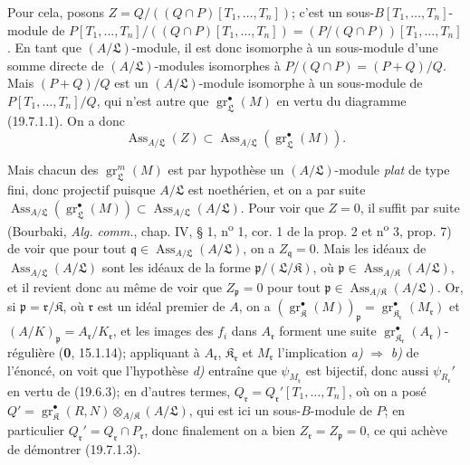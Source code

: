 Pour cela, posons $Z=Q/((Q\cap P)[T_1,\ldots,T_n])$; c'est un sous-$B[T_1,\ldots,T_n]$-module de $P[T_1,\ldots,T_n]/((Q\cap P)[T_1,\ldots,T_n])=(P/(Q\cap P))[T_1,\ldots,T_n]$. En tant que $(A/\mathfrak L)$-module, il est donc isomorphe à un sous-module d'une somme directe de $(A/\mathfrak L)$-modules isomorphes à $P/(Q\cap P)=(P+Q)/Q$. Mais $(P+Q)/Q$ est un $(A/\mathfrak L)$-module isomorphe à un sous-module de $P[T_1,\ldots,T_n]/Q$, qui n'est autre que $\operatorname{gr}_{\mathfrak L}^\bullet(M)$ en vertu du diagramme (19.7.1.1). On a donc
\begin{equation}
  \operatorname{Ass}_{A/\mathfrak L}(Z)\subset\operatorname{Ass}_{A/\mathfrak L}(\operatorname{gr}_{\mathfrak L}^\bullet(M)).
  \tag{19.7.1.4}\label{IV.19.7.1.4}
\end{equation}

Mais chacun des $\operatorname{gr}_{\mathfrak L}^m(M)$ est par hypothèse un $(A/\mathfrak L)$-module \emph{plat} de type fini, donc projectif puisque $A/\mathfrak L$ est noethérien, et on a par suite $\operatorname{Ass}_{A/\mathfrak L}(\operatorname{gr}_{\mathfrak L}^\bullet(M))\subset\operatorname{Ass}_{A/\mathfrak L}(A/\mathfrak L)$. Pour voir que $Z=0$, il suffit par suite (Bourbaki, \emph{Alg. comm.}, chap. IV, § 1, n\textsuperscript{o} 1, cor. 1 de la prop. 2 et n\textsuperscript{o} 3, prop. 7) de voir que pour tout $\mathfrak q\in\operatorname{Ass}_{A/\mathfrak L}(A/\mathfrak L)$, on a $Z_{\mathfrak q}=0$. Mais les idéaux de $\operatorname{Ass}_{A/\mathfrak L}(A/\mathfrak L)$ sont les idéaux de la forme $\mathfrak p/(\mathfrak L/\mathfrak K)$, où $\mathfrak p\in\operatorname{Ass}_{A/\mathfrak K}(A/\mathfrak L)$, et il revient donc au même de voir que $Z_{\mathfrak p}=0$ pour tout $\mathfrak p\in\operatorname{Ass}_{A/\mathfrak K}(A/\mathfrak L)$. Or, si $\mathfrak p=\mathfrak r/\mathfrak K$, où $\mathfrak r$ est un idéal premier de $A$, on a $(\operatorname{gr}_{\mathfrak K}^\bullet(M))_{\mathfrak p}=\operatorname{gr}_{\mathfrak K_{\mathfrak r}}^\bullet(M_{\mathfrak r})$ et $(A/K)_{\mathfrak p}=A_{\mathfrak r}/K_{\mathfrak r}$, et les images des $f_i$ dans $A_{\mathfrak r}$ forment une suite $\operatorname{gr}_{\mathfrak K_{\mathfrak r}}^\bullet(A_{\mathfrak r})$-régulière (\textbf{0}, 15.1.14); appliquant à $A_{\mathfrak r}$, $\mathfrak K_{\mathfrak r}$ et $M_{\mathfrak r}$ l'implication \emph{a)} $\Rightarrow$ \emph{b)} de l'énoncé, on voit que l'hypothèse \emph{d)} entraîne que $\psi_{M_{\mathfrak r}}$ est bijectif, donc aussi $\psi_{R_{\mathfrak r}}'$ en vertu de (19.6.3); en d'autres termes, $Q_{\mathfrak r}=Q_{\mathfrak r}'[T_1,\ldots,T_n]$, où on a posé $Q'=\operatorname{gr}_{\mathfrak K}^\bullet(R,N)\otimes_{A/\mathfrak K}(A/\mathfrak L)$, qui est ici un sous-$B$-module de $P$; en particulier $Q_{\mathfrak r}'=Q_{\mathfrak r}\cap P_{\mathfrak r}$, donc finalement on a bien $Z_{\mathfrak r}=Z_{\mathfrak p}=0$, ce qui achève de démontrer (19.7.1.3).

